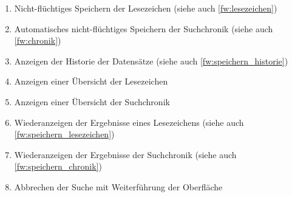 \begin{enumerate} [label=\bfseries /FW \arabic*0/, leftmargin=*]
	\item Nicht-flüchtiges Speichern der Lesezeichen (siehe auch \ref{fw:lesezeichen}) \label{fw:speichern_lesezeichen}
	\item Automatisches nicht-flüchtiges Speichern der Suchchronik (siehe auch \ref{fw:chronik}) \label{fw:speichern_chronik}
	\item Anzeigen der Historie der Datensätze (siehe auch \ref{fw:speichern_historie}) \label{fw:historie_uebersicht}
	\item Anzeigen einer Übersicht der Lesezeichen \label{fw:lesezeichen_uebersicht}
	\item Anzeigen einer Übersicht der Suchchronik \label{fw:chronik_uebersicht}
	\item Wiederanzeigen der Ergebnisse eines Lesezeichens (siehe auch \ref{fw:speichern_lesezeichen}) \label{fw:lesezeichen}
	\item Wiederanzeigen der Ergebnisse der Suchchronik (siehe auch \ref{fw:speichern_chronik}) \label{fw:chronik}
	\newline
	\item Abbrechen der Suche mit Weiterführung der Oberfläche \label{fw:suche_abbrechen}
\end{enumerate}
\pagebreak
